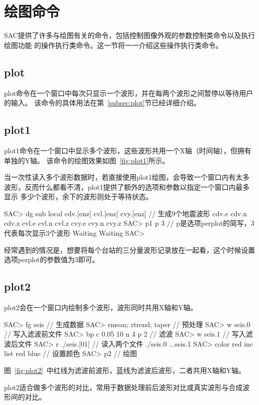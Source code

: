 \section{绘图命令}
SAC提供了许多与绘图有关的命令，包括控制图像外观的参数控制类命令以及执行绘图功能
的操作执行类命令。这一节将一一介绍这些操作执行类命令。

\subsection{plot}
plot命令在一个窗口中每次只显示一个波形，并在每两个波形之间暂停以等待用户的输入。
该命令的具体用法在第~\ref{subsec:plot}节已经详细介绍。

\subsection{plot1}
plot1命令在一个窗口中显示多个波形，这些波形共用一个X轴（时间轴），但拥有单独的Y轴。
该命令的绘图效果如图~\ref{fig:plot1}所示。

当一次性读入多个波形数据时，若直接使用plot1绘图，会导致一个窗口内有太多
波形，反而什么都看不清，plot1提供了额外的选项和参数以指定一个窗口内最多显示
多少个波形，余下的波形则处于等待状态。
\begin{SACCode}
SAC> dg sub local cdv.[enz] cvl.[enz] cvy.[enz]  // 生成9个地震波形
cdv.e cdv.n cdv.z cvl.e cvl.n cvl.z cvy.e cvy.n cvy.z
SAC> p1 p 3         // p是选项perplot的简写，3代表每次显示3个波形
Waiting
Waiting
SAC> 
\end{SACCode}
经常遇到的情况是，想要将每个台站的三分量波形记录放在一起看，这个时候设置选项perplot的参数值为3即可。

\subsection{plot2}
plot2会在一个窗口内绘制多个波形，波形同时共用X轴和Y轴。

\begin{SACCode}
SAC> fg seis                     // 生成数据
SAC> rmean; rtrend; taper        // 预处理
SAC> w seis.0                    // 写入滤波前文件
SAC> bp c 0.05 10 n 4 p 2        // 滤波
SAC> w seis.1                    // 写入滤波后文件
SAC> r ./seis.[01]               // 读入两个文件
./seis.0 ...seis.1
SAC> color red inc list red blue // 设置颜色
SAC> p2                          // 绘图
\end{SACCode}
图~\ref{fig:plot2}~中红线为滤波前波形，蓝线为滤波后波形，二者共用X轴和Y轴。

plot2适合做多个波形的对比，常用于数据处理前后波形对比或真实波形与合成波形间的对比。

